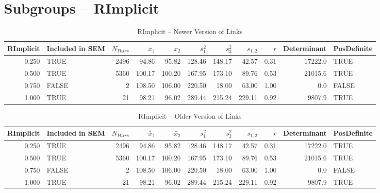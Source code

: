 \documentclass{article}\usepackage[]{graphicx}\usepackage[]{color}
\begin{document}
\section{Subgroups --  RImplicit }%
\begin{table}[ht]
\centering
\begin{tabular}{rlrrrrrrrrl}
  \hline
RImplicit & Included in SEM & $N_{Pairs}$ & $\bar{x}_1$ & $\bar{x}_2$ & $s_1^2$ & $s_2^2$ & $s_{1,2}$ & $r$ & Determinant & PosDefinite \\ 
  \hline
0.250 & TRUE & 2496 & 94.86 & 95.82 & 128.46 & 148.17 & 42.57 & 0.31 & 17222.0 & TRUE \\ 
  0.500 & TRUE & 5360 & 100.17 & 100.20 & 167.95 & 173.10 & 89.76 & 0.53 & 21015.6 & TRUE \\ 
  0.750 & FALSE & 2 & 108.50 & 106.00 & 220.50 & 18.00 & 63.00 & 1.00 & 0.0 & FALSE \\ 
  1.000 & TRUE & 21 & 98.21 & 96.02 & 289.44 & 215.24 & 229.11 & 0.92 & 9807.9 & TRUE \\ 
   \hline
\end{tabular}
\caption{RImplicit -- Newer Version of Links} 
\end{table}
\begin{table}[ht]
\centering
\begin{tabular}{rlrrrrrrrrl}
  \hline
RImplicit & Included in SEM & $N_{Pairs}$ & $\bar{x}_1$ & $\bar{x}_2$ & $s_1^2$ & $s_2^2$ & $s_{1,2}$ & $r$ & Determinant & PosDefinite \\ 
  \hline
0.250 & TRUE & 2496 & 94.86 & 95.82 & 128.46 & 148.17 & 42.57 & 0.31 & 17222.0 & TRUE \\ 
  0.500 & TRUE & 5360 & 100.17 & 100.20 & 167.95 & 173.10 & 89.76 & 0.53 & 21015.6 & TRUE \\ 
  0.750 & FALSE & 2 & 108.50 & 106.00 & 220.50 & 18.00 & 63.00 & 1.00 & 0.0 & FALSE \\ 
  1.000 & TRUE & 21 & 98.21 & 96.02 & 289.44 & 215.24 & 229.11 & 0.92 & 9807.9 & TRUE \\ 
   \hline
\end{tabular}
\caption{RImplicit -- Older Version of Links} 
\end{table}
\end{document}
